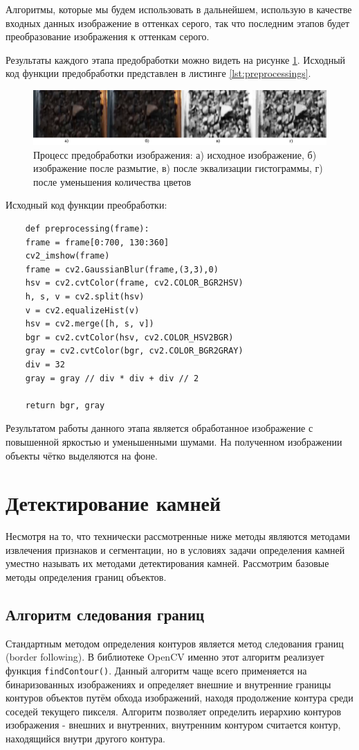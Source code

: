 \documentclass[specification,annotation,times]{itmo-student-thesis}
\begin{document}
Алгоритмы, которые мы будем использовать в дальнейшем, использую в качестве входных данных изображение в оттенках серого, так что последним этапов будет преобразование изображения к оттенкам серого. 

Результаты каждого этапа предобработки можно видеть на рисунке \ref{fig:preprocessing}. Исходный код функции предобработки представлен в листинге \ref{lst:preprocessings}.
\begin{figure}[h!]
	\centering
	\includegraphics[width=\linewidth]{images/preprocessing}
	\caption{Процесс предобработки изображения: а) исходное изображение, б) изображение после размытие, в) после эквализации гистограммы, г) после уменьшения количества цветов }
	\label{fig:preprocessing}
\end{figure}

\begin{algorithm}[!h]
	\caption{Исходный код функции преобработки:}\label{lst:preprocessing}
	\begin{lstlisting}
	def preprocessing(frame):
	frame = frame[0:700, 130:360]
	cv2_imshow(frame)
	frame = cv2.GaussianBlur(frame,(3,3),0)
	hsv = cv2.cvtColor(frame, cv2.COLOR_BGR2HSV)
	h, s, v = cv2.split(hsv)
	v = cv2.equalizeHist(v)
	hsv = cv2.merge([h, s, v])
	bgr = cv2.cvtColor(hsv, cv2.COLOR_HSV2BGR)
	gray = cv2.cvtColor(bgr, cv2.COLOR_BGR2GRAY)
	div = 32
	gray = gray // div * div + div // 2
	
	return bgr, gray
	\end{lstlisting}
\end{algorithm}

Результатом работы данного этапа является обработанное изображение с повышенной яркостью и уменьшенными шумами. На полученном изображении объекты чётко выделяются на фоне.


\section{Детектирование камней}
Несмотря на то, что технически рассмотренные ниже методы являются методами извлечения признаков и сегментации, но в условиях задачи определения камней уместно называть их методами детектирования камней. Рассмотрим базовые методы определения границ объектов. 
\subsection{Алгоритм следования границ}
Стандартным методом определения контуров является метод следования границ (border following). В библиотеке OpenCV именно этот алгоритм реализует функция \texttt{findContour()}. Данный алгоритм чаще всего применяется на бинаризованных изображениях и определяет внешние и внутренние границы контуров объектов путём обхода изображений, находя продолжение контура среди соседей текущего пикселя. Алгоритм позволяет определить иерархию контуров изображения - внешних и внутренних, внутренним контуром считается контур, находящийся внутри другого контура. 
\end{document}
